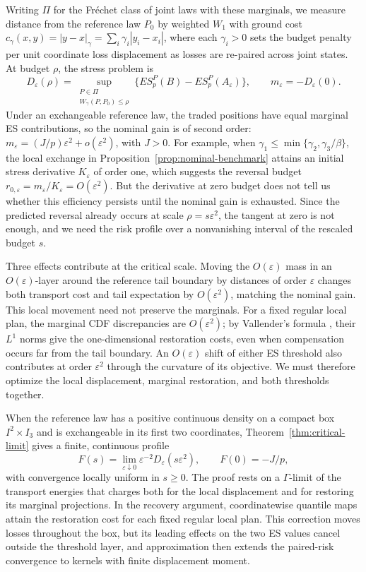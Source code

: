 Writing \(\Pi\) for the Fr\'echet class of joint laws with these marginals, we measure distance from the reference law \(P_0\) by weighted \(W_1\) with ground cost \(c_\gamma(x,y)=|y-x|_\gamma=\sum_i\gamma_i|y_i-x_i|\), where each \(\gamma_i>0\) sets the budget penalty per unit coordinate loss displacement as losses are re-paired across joint states. At budget \(\rho\), the stress problem is
\[
D_\varepsilon(\rho)
=\sup_{\substack{P\in\Pi\\ W_\gamma(P,P_0)\le\rho}}
\bigl\{ES_p^P(B)-ES_p^P(A_\varepsilon)\bigr\},
\qquad m_\varepsilon=-D_\varepsilon(0).
\]
Under an exchangeable reference law, the traded positions have equal marginal ES contributions, so the nominal gain is of second order: \(m_\varepsilon=(J/p)\varepsilon^2+o(\varepsilon^2)\), with \(J>0\). For example, when \(\gamma_1\le\min\{\gamma_2,\gamma_3/\beta\}\), the local exchange in Proposition~\ref{prop:nominal-benchmark} attains an initial stress derivative \(K_\varepsilon\) of order one, which suggests the reversal budget \(r_{0,\varepsilon}=m_\varepsilon/K_\varepsilon=O(\varepsilon^2)\). But the derivative at zero budget does not tell us whether this efficiency persists until the nominal gain is exhausted. Since the predicted reversal already occurs at scale \(\rho=s\varepsilon^2\), the tangent at zero is not enough, and we need the risk profile over a nonvanishing interval of the rescaled budget \(s\).

Three effects contribute at the critical scale. Moving the \(O(\varepsilon)\) mass in an \(O(\varepsilon)\)-layer around the reference tail boundary by distances of order \(\varepsilon\) changes both transport cost and tail expectation by \(O(\varepsilon^2)\), matching the nominal gain. This local movement need not preserve the marginals. For a fixed regular local plan, the marginal CDF discrepancies are \(O(\varepsilon^2)\); by Vallender's formula \cite{vallender1974}, their \(L^1\) norms give the one-dimensional restoration costs, even when compensation occurs far from the tail boundary. An \(O(\varepsilon)\) shift of either ES threshold also contributes at order \(\varepsilon^2\) through the curvature of its objective. We must therefore optimize the local displacement, marginal restoration, and both thresholds together.

When the reference law has a positive continuous density on a compact box \(I^2\times I_3\) and is exchangeable in its first two coordinates, Theorem~\ref{thm:critical-limit} gives a finite, continuous profile
\[
F(s)=\lim_{\varepsilon\downarrow0}\varepsilon^{-2}D_\varepsilon(s\varepsilon^2),
\qquad F(0)=-J/p,
\]
with convergence locally uniform in \(s\ge0\). The proof rests on a \(\Gamma\)-limit \cite{dalmaso1993} of the transport energies that charges both for the local displacement and for restoring its marginal projections. In the recovery argument, coordinatewise quantile maps attain the restoration cost for each fixed regular local plan. This correction moves losses throughout the box, but its leading effects on the two ES values cancel outside the threshold layer, and approximation then extends the paired-risk convergence to kernels with finite displacement moment.

